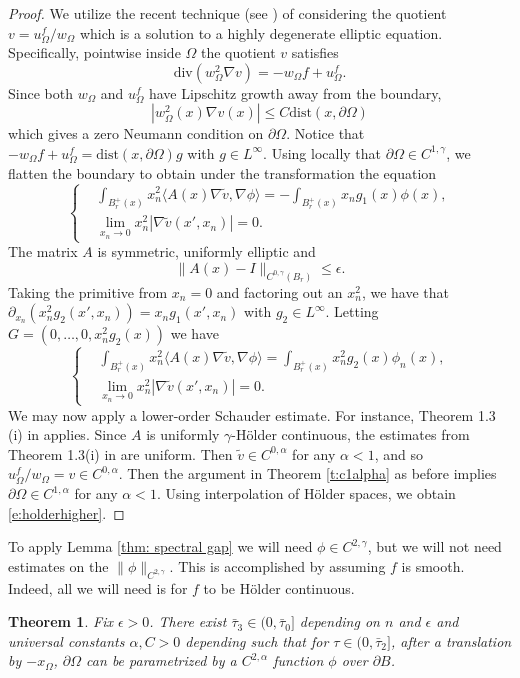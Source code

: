 \documentclass[10pt, reqno]{amsart}
\numberwithin{equation}{section}
\newtheorem{theorem}{Theorem}[section]
\def\W{\Omega}
\begin{document}
\begin{proof}
 We utilize the recent technique (see \cite{dp23,ttv24,z24,aks25}) of considering the quotient $v=u_{\W}^f/w_{\W}$ which is a solution to a highly degenerate elliptic equation. Specifically, pointwise inside $\W$ the quotient $v$ satisfies 
 \[
 \text{div}\left(w_{\Omega}^2 \nabla v\right)= -w_{\Omega}f+u_{\Omega}^f.
\]
Since both $w_{\Omega}$ and $u_{\Omega}^f$ have Lipschitz growth away from the boundary, 
\[
|w_{\Omega}^2(x) \nabla v(x)| \leq C\text{dist}(x,\partial \Omega)
\]
which gives a zero Neumann condition on $\partial \W$. 
Notice that $-w_{\Omega}f+u_{\Omega}^f=\text{dist}(x,\partial \W) g$ with $g \in L^{\infty}$. 
Using locally that $\partial \Omega \in C^{1,\gamma}$, we flatten the boundary to obtain under the transformation the equation 
\[
 \begin{cases}
 &\int_{B^+_r(x)} x_n^2 \langle A(x) \nabla \tilde{v}, \nabla \phi \rangle = -
 \int_{B^+_r(x)} x_n g_1(x) \phi(x), \\
 & \lim_{x_n \to 0} x_n^2 |\nabla \tilde{v}(x',x_n)|=0.
 \end{cases}
\]
 The matrix $A$ is symmetric, uniformly elliptic and 
\[
 \| A(x)-I \|_{C^{0,\gamma}(B_r)} \leq \epsilon. 
\]
Taking the primitive from $x_n=0$ and factoring out an $x_n^2$, we have that $\partial_{x_n} (x_n^2 g_2(x',x_n))=x_n g_1(x',x_n)$
with $g_2 \in L^{\infty}$. Letting $G=(0,\ldots,0,x_n^2 g_2(x))$ we have 
\[
 \begin{cases}
 &\int_{B^+_r(x)} x_n^2 \langle A(x) \nabla \tilde{v}, \nabla \phi \rangle = 
 \int_{B^+_r(x)} x_n^2 g_2(x) \phi_n(x), \\
 & \lim_{x_n \to 0} x_n^2 |\nabla \tilde{v}(x',x_n)|=0.
 \end{cases}
\]
We may now apply a lower-order Schauder estimate. For instance, Theorem 1.3 (i) in \cite{stv21} applies. Since $A$ is uniformly $\gamma$-H\"older continuous, the estimates from Theorem 1.3(i) in \cite{stv21} are uniform. Then $\tilde{v}\in C^{0,\alpha}$ for any $\alpha<1$, and so $u_{\W}^f/w_{\W} = v \in C^{0,\alpha}$. Then the argument in Theorem \ref{t:c1alpha} as before implies $\partial \W \in C^{1,\alpha}$ for any $\alpha<1$. Using interpolation of H\"older spaces, we obtain \eqref{e:holderhigher}. 
\end{proof}


{To apply Lemma \ref{thm: spectral gap} we will need $\phi \in C^{2,\gamma}$, but we will not need estimates on the $\|\phi\|_{C^{2,\gamma}}$. This is accomplished by assuming $f$ is smooth. Indeed, all we will need is for $f$ to be H\"older continuous.} 
\begin{theorem} \label{t:c2alpha}
Fix $\epsilon>0$. There exist $\bar{\tau}_3 \in (0, \bar{\tau}_0]$ depending on $n$ and $\epsilon$ and universal constants $\alpha,C>0$ depending such that for $\tau \in (0,\bar{\tau}_2]$, after a translation by $-x_\W$,   $\partial \W$ can be parametrized by a $C^{2,\alpha}$ function $\phi$ over $\partial B$.  
\end{theorem}
\end{document}
